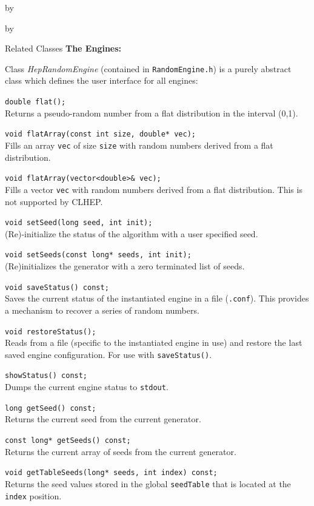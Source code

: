 \documentclass[twoside]{article}
\newcommand{\comp}[1]{\texttt{#1}}%
\newcommand{\entrylabel}[1]{\mbox{\textbf{{#1}}}\hfil}%
\newenvironment{entry}
{\begin{list}{}%
    {\renewcommand{\makelabel}{\entrylabel}%
     \setlength{\labelwidth}{90pt}%
     \setlength{\leftmargin}{\labelwidth}
     \advance\leftmargin by \labelsep%
      }%
    }%
  {\end{list}}
\newcommand{\Entrylabel}[1]%
{\raisebox{0pt}[1ex][0pt]{\makebox[\labelwidth][l]%
    {\parbox[t]{\labelwidth}{\hspace{0pt}\textbf{{#1}}}}}}
\newenvironment{Entry}%
{\renewcommand{\entrylabel}{\Entrylabel}\begin{entry}}%
  {\end{entry}}
\begin{document}
\begin{description}
\begin{Entry}
\begin{Entry}
\item[Related Classes]
  {\bf The Engines:}
  
    Class {\em HepRandomEngine} (contained in \comp{RandomEngine.h}) is a purely
    abstract class which defines the user interface for all engines:

     \verb+double flat();+\\
     Returns a pseudo-random number from a flat distribution
     in the interval (0,1).

     \verb+void flatArray(const int size, double* vec);+\\
     Fills an array \comp{vec} of size \comp{size} with random
     numbers derived from a flat distribution.

     \verb+void flatArray(vector<double>& vec);+\\
     Fills a vector \comp{vec} with random
     numbers derived from a flat distribution.  This is
     not supported by CLHEP.
     
     \verb+void setSeed(long seed, int init);+\\
     (Re)-initialize the status of the algorithm with a user specified
     seed.
     
     \verb+void setSeeds(const long* seeds, int init);+\\
     (Re)initializes the generator with a zero terminated list of seeds.
     
     \verb+void saveStatus() const;+\\
     Saves the current status of the instantiated engine
     in a file (\comp{.conf}).  This provides a mechanism
     to recover a series of random numbers.

     \verb+void restoreStatus();+ \\
     Reads from a file (specific to the instantiated engine in use)
     and restore the last saved engine configuration.  For use with
     \comp{saveStatus()}.

     \verb+showStatus() const;+\\
     Dumps the current engine status to \comp{stdout}.

     \verb+long getSeed() const;+\\
     Returns the current seed from the current generator.

     \verb+const long* getSeeds() const;+\\
     Returns the current array of seeds from the current generator.

     \verb+void getTableSeeds(long* seeds, int index) const;+\\
     Returns the seed values stored in the global \comp{seedTable}
     that is located at the \comp{index} position.


\end{Entry}
\end{Entry}
\end{description}
\end{document}
